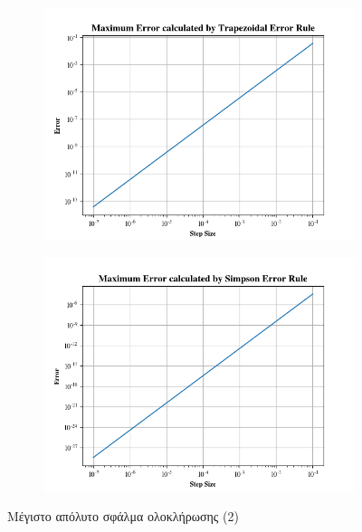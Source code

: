 \documentclass{article}
\begin{document}
\vspace*{\fill}
\newpage

\begin{figure}[H]

    \centering	
	\begin{adjustbox}{center}
		\begin{subfigure}[c]{.8\textwidth}    
			\includegraphics[width=1\textwidth,height=\textheight,keepaspectratio]{media/1/Figure_6.png}
		\end{subfigure}%
		
		\begin{subfigure}[c]{.8\textwidth}    
			\includegraphics[width=1\textwidth,height=\textheight,keepaspectratio]{media/1/Figure_8.png}
		\end{subfigure}%
	\end{adjustbox}
	\caption{Μέγιστο απόλυτο σφάλμα ολοκλήρωσης (2)}
	\label{(Errors 2)}
\end{figure}		
\end{document}
